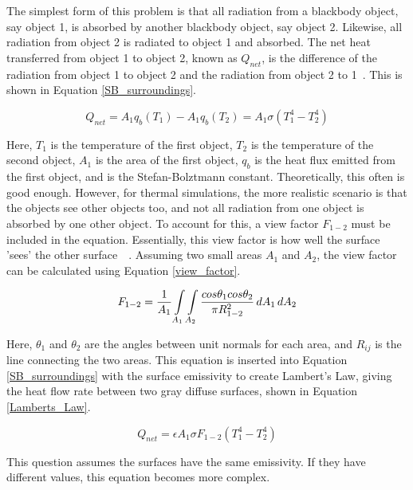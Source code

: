 The simplest form of this problem is that all radiation from a blackbody object, say object 1, is absorbed by another blackbody object, say object 2. Likewise, all radiation from object 2 is radiated to object 1 and absorbed. The net heat transferred from object 1 to object 2, known as $Q_{net}$, is the difference of the radiation from object 1 to object 2 and the radiation from object 2 to 1~\citep{heat_transfer_textbook}. This is shown in Equation \ref{SB_surroundings}.

\begin{equation}\label{SB_surroundings}
    Q_{net} = A_1 q_b (T_1) - A_1 q_b (T_2) = A_1 \sigma (T_1^4 - T_2^4)
\end{equation}

Here, $T_1$ is the temperature of the first object, $T_2$ is the temperature of the second object, $A_1$ is the area of the first object, $q_b$ is the heat flux emitted from the first object, and {\textsigma} is the Stefan-Bolztmann constant. Theoretically, this often is good enough. However, for thermal simulations, the more realistic scenario is that the objects see other objects too, and not all radiation from one object is absorbed by one other object. To account for this, a view factor $F_{1-2}$ must be included in the equation. Essentially, this view factor is how well the surface 'sees' the other surface~\citep{heat_transfer_textbook}~\citep{FEA_SW}. Assuming two small areas $A_1$ and $A_2$, the view factor can be calculated using Equation \ref{view_factor}.

\begin{equation}\label{view_factor}
    F_{1-2} = \frac{1}{A_1} \int\limits_{A_1} \int\limits_{A_2} \frac{cos \theta_1 cos \theta_2}{\pi R_{1-2}^2} \,dA_1\,dA_2
\end{equation}

Here, $\theta_1$ and $\theta_2$ are the angles between unit normals for each area, and $R_{ij}$ is the line connecting the two areas. This equation is inserted into Equation \ref{SB_surroundings} with the surface emissivity to create Lambert's Law, giving the heat flow rate between two gray diffuse surfaces, shown in Equation \ref{Lamberts_Law}.

\begin{equation}\label{Lamberts_Law}
    Q_{net} = \epsilon A_1 \sigma F_{1-2} (T_1^4 - T_2^4)
\end{equation}

This question assumes the surfaces have the same emissivity. If they have different values, this equation becomes more complex.

